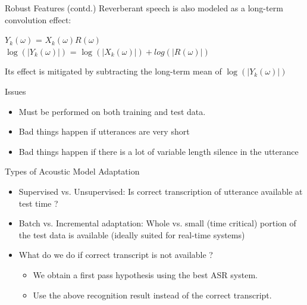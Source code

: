 \begin{frame}{Robust Features (contd.)}
Reverberant speech is also modeled as a long-term convolution effect:
        \begin{center}
                $Y_k(\omega)$ = $X_k(\omega)R(\omega)$\\
                $\log(|Y_k(\omega)|)$ = $\log(|X_k(\omega)|)+log(|R(\omega)|)$
        \end{center}
        
Its effect is mitigated by subtracting the \alert{long-term} mean of $\log(|Y_k(\omega)|)$ 
\end{frame}
        
\begin{frame}{Issues}
\begin{itemize}
\item  Must be performed on both training and test data.
\item  Bad things happen if utterances are very short
\item  Bad things happen if there is a lot of variable length silence in the utterance
\end{itemize}

\end{frame}


\begin{frame} {Types of Acoustic Model Adaptation}
\begin{itemize}
\item {\color{blue} Supervised } vs. {\color{blue} Unsupervised:} Is correct transcription of utterance available at test time ?
\item {\color{blue} Batch} vs.{\color{blue}  Incremental adaptation:} Whole vs. small (time critical) portion of the test data is available (ideally suited for real-time systems)
\item What do we do if correct transcript is not available ?
\begin{itemize}
\item We obtain a first pass hypothesis using the best ASR system.
\item Use the above recognition result instead of the correct transcript.
\end{itemize}
\end{itemize}

\end{frame}

